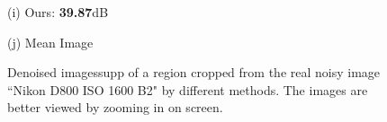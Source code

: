 \documentclass[10pt,onecolumn,letterpaper]{article}
\begin{document}
\begin{figure}[H]
{\begin{minipage}[t]{0.196\textwidth}
{\footnotesize (i) Ours: \textbf{39.87}dB  }
\end{minipage}
\begin{minipage}[t]{0.196\textwidth}
\centering
{}
{\footnotesize (j) Mean Image \cite{crosschannel2016} }
\end{minipage}
}
\caption{Denoised imagessupp of a region cropped from the real noisy image ``Nikon D800 ISO 1600 B2" \cite{crosschannel2016} by different methods. The images are better viewed by zooming in on screen.} 
\label{fig15}
\end{figure}
\end{document}

